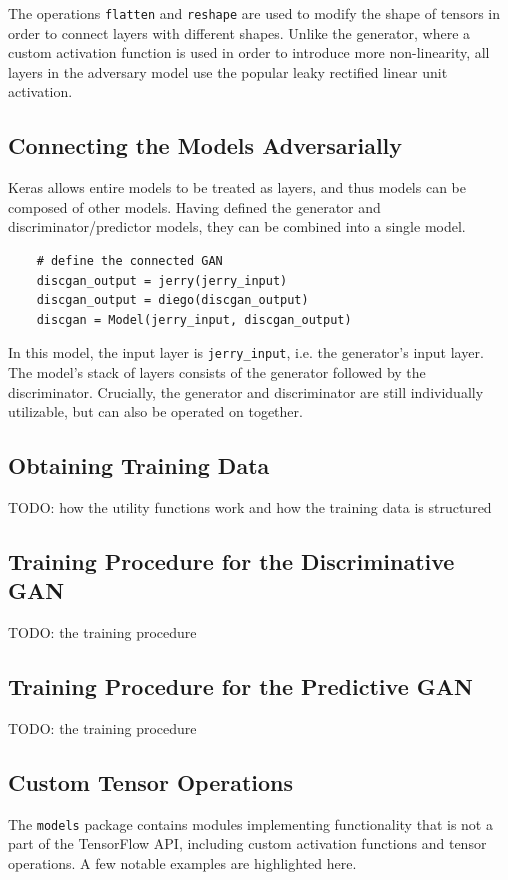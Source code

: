 \documentclass[12pt, titlepage]{report}
\theoremstyle{definition}
\begin{document}
The operations \texttt{flatten} and \texttt{reshape} are used to modify the shape of tensors in order to connect layers with different shapes. Unlike the generator, where a custom activation function is used in order to introduce more non-linearity, all layers in the adversary model use the popular leaky rectified linear unit activation.



\subsection{Connecting the Models Adversarially}
Keras allows entire models to be treated as layers, and thus models can be composed of other models. Having defined the generator and discriminator/predictor models, they can be combined into a single model.

\begin{verbatim}
    # define the connected GAN
    discgan_output = jerry(jerry_input)
    discgan_output = diego(discgan_output)
    discgan = Model(jerry_input, discgan_output)
\end{verbatim}

In this model, the input layer is \texttt{jerry_input}, i.e. the generator's input layer. The model's stack of layers consists of the generator followed by the discriminator. Crucially, the generator and discriminator are still individually utilizable, but can also be operated on together.

\subsection{Obtaining Training Data}
TODO: how the utility functions work and how the training data is structured
\subsection{Training Procedure for the Discriminative GAN}
TODO: the training procedure
\subsection{Training Procedure for the Predictive GAN}
TODO: the training procedure
\subsection{Custom Tensor Operations}\label{subsection:custom_ops}
The \texttt{models} package contains modules implementing functionality that is not a part of the TensorFlow API, including custom activation functions and tensor operations. A few notable examples are highlighted here.
\end{document}
